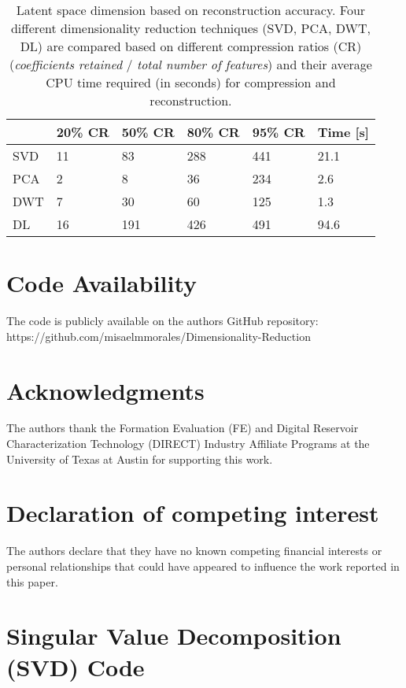 \documentclass[a4paper,fleqn,12pt]{article}
\begin{document}
\begin{table}[H]
    \centering
    \begin{tabular}{|l|l|l|l|l|l|}
    \hline
        & 20\% CR & 50\% CR & 80\% CR & 95\% CR & Time [s]  \\
    \hline
    SVD & 11  & 83  & 288 & 441 & 21.1          \\
    PCA & 2   & 8   & 36  & 234 & 2.6           \\
    DWT & 7   & 30  & 60  & 125 & 1.3           \\
    DL  & 16  & 191 & 426 & 491 & 94.6          \\
    \hline
    \end{tabular}
    \caption{Latent space dimension based on reconstruction accuracy. Four different dimensionality reduction techniques (SVD, PCA, DWT, DL) are compared based on different compression ratios (CR) (\emph{coefficients retained} / \emph{total number of features}) and their average CPU time required (in seconds) for compression and reconstruction.}
    \label{tab:comparison}
\end{table}

\pagebreak
\section*{Code Availability}
The code is publicly available on the authors GitHub repository: \\ https://github.com/misaelmmorales/Dimensionality-Reduction

\section*{Acknowledgments}
The authors thank the Formation Evaluation (FE) and Digital Reservoir Characterization Technology (DIRECT) Industry Affiliate Programs at the University of Texas at Austin for supporting this work.

\section*{Declaration of competing interest}
The authors declare that they have no known competing financial interests or personal relationships that could have appeared to influence the work reported in this paper.

\pagebreak
\appendix

\section{Singular Value Decomposition (SVD) Code}\label{app:svd}
\inputminted[frame=lines, framesep=2mm, baselinestretch=1.2, 
             bgcolor=LightGray, fontsize=\footnotesize, linenos]
{python}{codes/svd.py}
\end{document}

